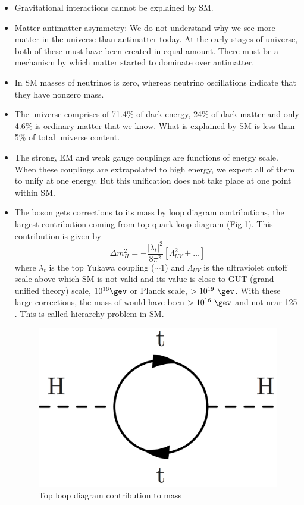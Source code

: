 \begin{itemize}
\item Gravitational interactions cannot be explained by SM.
\item Matter-antimatter asymmetry: We do not understand why we see more matter in the universe than antimatter today. At the early stages of universe, both of these must have been created in equal amount. There must be a mechanism by which matter started to dominate over antimatter.
\item In SM masses of neutrinos is zero, whereas neutrino oscillations indicate that they have nonzero mass.
\item The universe comprises of 71.4\% of dark energy, 24\% of dark matter and only 4.6\% is ordinary matter that we know. What is explained by SM is less than 5\% of total universe content.
\item The strong, EM and weak gauge couplings are functions of energy scale. When these couplings are extrapolated to high energy, we expect all of them to unify at one energy. But this unification does not take place at one point within SM.
\item The \higgs boson gets corrections to its mass by loop diagram contributions, the largest contribution coming from top quark loop diagram (Fig.\ref{fig:hierarchy_problem_higgs}). This contribution is given by
\begin{equation}
\Delta m_{H}^2 = -\frac{|\lambda_t|^2}{8\pi^2}[\Lambda_{UV}^2 + \dots]
\label{eqn:HmassCorr}
\end{equation}
where $\lambda_t$ is the top Yukawa coupling ($\sim 1$) and $\Lambda_{UV}$ is the ultraviolet cutoff scale above which SM is not valid and its value is close to GUT (grand unified theory) scale, $10^{16}\gev$ or Planck scale, $> 10^{19}\ \gev$. With these large corrections, the mass of \higgs would have been $> 10^{16}\ \gev$ and not near 125 \gev. This is called hierarchy problem in SM.
\begin{figure}[h!]
\centering
\includegraphics[width=0.35\linewidth]{../Figures/hierarchy_problem_higgs.png}
\caption{Top loop diagram contribution to \higgs mass}
\label{fig:hierarchy_problem_higgs}
\end{figure}
\end{itemize}

